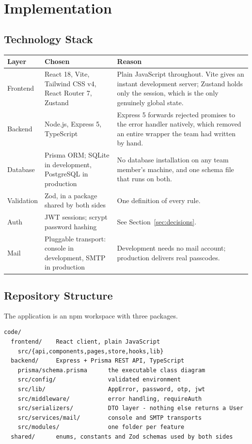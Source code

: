\documentclass[twoside,12pt]{tietreport}
\begin{document}
\chapter{Implementation}
\label{ch:implementation}

\section{Technology Stack}

\begin{longtable}{@{}p{3.0cm}p{4.6cm}p{5.4cm}@{}}
\toprule
\textbf{Layer} & \textbf{Chosen} & \textbf{Reason} \\
\midrule
\endhead
Frontend & React 18, Vite, Tailwind CSS v4, React Router 7, Zustand &
Plain JavaScript throughout. Vite gives an instant development server; Zustand
holds only the session, which is the only genuinely global state. \\
\addlinespace
Backend & Node.js, Express 5, TypeScript &
Express 5 forwards rejected promises to the error handler natively, which
removed an entire wrapper the team had written by hand. \\
\addlinespace
Database & Prisma ORM; SQLite in development, PostgreSQL in production &
No database installation on any team member's machine, and one schema file that
runs on both. \\
\addlinespace
Validation & Zod, in a package shared by both sides &
One definition of every rule. \\
\addlinespace
Auth & JWT sessions; scrypt password hashing &
See Section~\ref{sec:decisions}. \\
\addlinespace
Mail & Pluggable transport: console in development, SMTP in production &
Development needs no mail account; production delivers real passcodes. \\
\bottomrule
\end{longtable}

\section{Repository Structure}

The application is an npm workspace with three packages.

\begin{lstlisting}
code/
  frontend/    React client, plain JavaScript
    src/{api,components,pages,store,hooks,lib}
  backend/     Express + Prisma REST API, TypeScript
    prisma/schema.prisma      the executable class diagram
    src/config/               validated environment
    src/lib/                  AppError, password, otp, jwt
    src/middleware/           error handling, requireAuth
    src/serializers/          DTO layer - nothing else returns a User
    src/services/mail/        console and SMTP transports
    src/modules/              one folder per feature
  shared/      enums, constants and Zod schemas used by both sides
\end{lstlisting}
\end{document}
